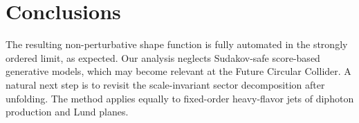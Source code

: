 \section{Conclusions}\label{sec:conclusions}

The resulting non-perturbative shape function is fully automated in the
strongly ordered limit, as expected. Our analysis neglects Sudakov-safe
score-based generative models, which may become relevant at the Future
Circular Collider. A natural next step is to revisit the scale-invariant
sector decomposition after unfolding. The method applies equally to
fixed-order heavy-flavor jets of diphoton production and Lund planes.

